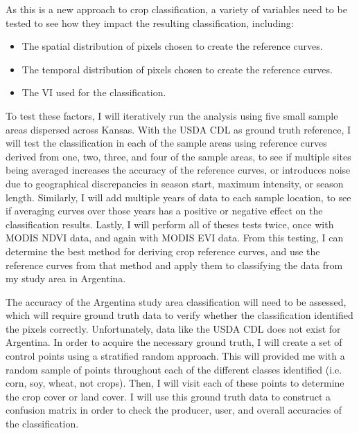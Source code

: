 As this is a new approach to crop classification, a variety of variables need to be tested to see how they impact the resulting classification, including:
\begin{Spacing}{1.2}
\begin{itemize}
  \item The spatial distribution of pixels chosen to create the reference curves.
  \item The temporal distribution of pixels chosen to create the reference curves.
  \item The VI used for the classification.
\end{itemize}
\end{Spacing}
To test these factors, I will iteratively run the analysis using five small sample areas dispersed across Kansas. With the USDA CDL as ground truth reference, I will test the classification in each of the sample areas using reference curves derived from one, two, three, and four of the sample areas, to see if multiple sites being averaged increases the accuracy of the reference curves, or introduces noise due to geographical discrepancies in season start, maximum intensity, or season length. Similarly, I will add multiple years of data to each sample location, to see if averaging curves over those years has a positive or negative effect on the classification results. Lastly, I will perform all of theses tests twice, once with MODIS NDVI data, and again with MODIS EVI data. From this testing, I can determine the best method for deriving crop reference curves, and use the reference curves from that method and apply them to classifying the data from my study area in Argentina.

The accuracy of the Argentina study area classification will need to be assessed, which will require ground truth data to verify whether the classification identified the pixels correctly. Unfortunately, data like the USDA CDL does not exist for Argentina. In order to acquire the necessary ground truth, I will create a set of control points using a stratified random approach. This will provided me with a random sample of points throughout each of the different classes identified (i.e. corn, soy, wheat, not crops). Then, I will visit each of these points to determine the crop cover or land cover. I will use this ground truth data to construct a confusion matrix in order to check the producer, user, and overall accuracies of the classification.